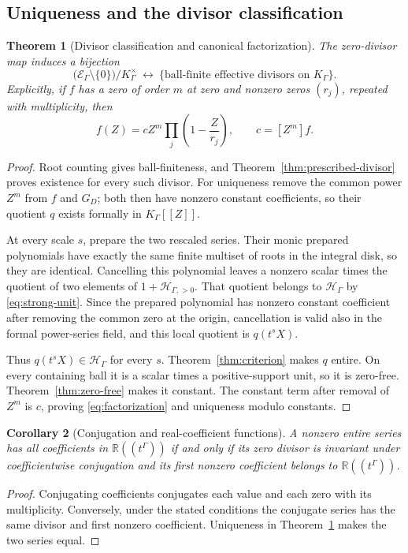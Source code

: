 \documentclass[11pt,letterpaper]{article}
\numberwithin{equation}{section}
\newtheorem{theorem}{Theorem}[section]
\newtheorem{corollary}[theorem]{Corollary}
\theoremstyle{definition}
\theoremstyle{remark}
\newcommand{\R}{\mathbb R}
\begin{document}
\subsection{Uniqueness and the divisor classification}
\begin{theorem}[Divisor classification and canonical factorization]
\label{thm:factorization}
The zero-divisor map induces a bijection
\[
 \bigl(\mathcal E_\Gamma\setminus\{0\}\bigr)/K_\Gamma^\times
 \ \longleftrightarrow\
 \{\text{ball-finite effective divisors on }K_\Gamma\}.
\]
Explicitly, if $f$ has a zero of order $m$ at zero and nonzero zeros $(r_j)$,
repeated with multiplicity, then
\begin{equation}\label{eq:factorization}
 f(Z)=cZ^m\prod_j\left(1-\frac Z{r_j}\right),
 \qquad c=[Z^m]f.
\end{equation}
\end{theorem}
\begin{proof}
Root counting gives ball-finiteness, and
Theorem~\ref{thm:prescribed-divisor} proves existence for every such divisor.
For uniqueness remove the common power $Z^m$ from $f$ and $G_D$; both then
have nonzero constant coefficients, so their quotient $q$ exists formally in
$K_\Gamma[[Z]]$.

At every scale $s$, prepare the two rescaled series. Their monic prepared
polynomials have exactly the same finite multiset of roots in the integral
disk, so they are identical. Cancelling this polynomial leaves a nonzero
scalar times the quotient of two elements of
$1+\mathcal H_{\Gamma,>0}$. That quotient belongs to
$\mathcal H_\Gamma$ by \eqref{eq:strong-unit}. Since the prepared polynomial
has nonzero constant coefficient after removing the common zero at the
origin, cancellation is valid also in the formal power-series field, and
this local quotient is $q(t^sX)$.

Thus $q(t^sX)\in\mathcal H_\Gamma$ for every $s$. Theorem~\ref{thm:criterion}
makes $q$ entire. On every containing ball it is a scalar times a positive-support
unit, so it is zero-free. Theorem~\ref{thm:zero-free} makes it constant.
The constant term after removal of $Z^m$ is $c$, proving
\eqref{eq:factorization} and uniqueness modulo constants.
\end{proof}

\begin{corollary}[Conjugation and real-coefficient functions]
A nonzero entire series has all coefficients in $\R((t^\Gamma))$ if and
only if its zero divisor is invariant under coefficientwise conjugation and
its first nonzero coefficient belongs to $\R((t^\Gamma))$.
\end{corollary}
\begin{proof}
Conjugating coefficients conjugates each value and each zero with its
multiplicity. Conversely, under the stated conditions the conjugate series
has the same divisor and first nonzero coefficient. Uniqueness in
Theorem~\ref{thm:factorization} makes the two series equal.
\end{proof}
\end{document}
